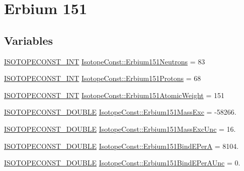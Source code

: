 \hypertarget{group___isotope_const-_erbium-_er151}{}\section{Erbium 151}
\label{group___isotope_const-_erbium-_er151}
\subsection*{Variables}
\begin{DoxyCompactItemize}
\item 
\mbox{\hyperlink{group___isotope_const-_macros_ga5f18360b3e99483a35c32d789e62621c}{I\+S\+O\+T\+O\+P\+E\+C\+O\+N\+S\+T\+\_\+\+I\+NT}} \mbox{\hyperlink{group___isotope_const-_erbium-_er151_ga3f9974804b4c5e005ab739509f5ff448}{Isotope\+Const\+::\+Erbium151\+Neutrons}} = 83
\item 
\mbox{\hyperlink{group___isotope_const-_macros_ga5f18360b3e99483a35c32d789e62621c}{I\+S\+O\+T\+O\+P\+E\+C\+O\+N\+S\+T\+\_\+\+I\+NT}} \mbox{\hyperlink{group___isotope_const-_erbium-_er151_gac02b4fea50718a36bfa658124609d28b}{Isotope\+Const\+::\+Erbium151\+Protons}} = 68
\item 
\mbox{\hyperlink{group___isotope_const-_macros_ga5f18360b3e99483a35c32d789e62621c}{I\+S\+O\+T\+O\+P\+E\+C\+O\+N\+S\+T\+\_\+\+I\+NT}} \mbox{\hyperlink{group___isotope_const-_erbium-_er151_ga653920cb7f79cdd1aef7ffa2ba339f72}{Isotope\+Const\+::\+Erbium151\+Atomic\+Weight}} = 151
\item 
\mbox{\hyperlink{group___isotope_const-_macros_ga8f45a7272ce02c0b4c65c44636ed719a}{I\+S\+O\+T\+O\+P\+E\+C\+O\+N\+S\+T\+\_\+\+D\+O\+U\+B\+LE}} \mbox{\hyperlink{group___isotope_const-_erbium-_er151_gaad65f0a01d1cb60bead2738827e151b6}{Isotope\+Const\+::\+Erbium151\+Mass\+Exc}} = -\/58266.
\item 
\mbox{\hyperlink{group___isotope_const-_macros_ga8f45a7272ce02c0b4c65c44636ed719a}{I\+S\+O\+T\+O\+P\+E\+C\+O\+N\+S\+T\+\_\+\+D\+O\+U\+B\+LE}} \mbox{\hyperlink{group___isotope_const-_erbium-_er151_ga5e1824c3d80a27d0688bdf2b682cf31a}{Isotope\+Const\+::\+Erbium151\+Mass\+Exc\+Unc}} = 16.
\item 
\mbox{\hyperlink{group___isotope_const-_macros_ga8f45a7272ce02c0b4c65c44636ed719a}{I\+S\+O\+T\+O\+P\+E\+C\+O\+N\+S\+T\+\_\+\+D\+O\+U\+B\+LE}} \mbox{\hyperlink{group___isotope_const-_erbium-_er151_ga65886f31b1e0c0997cd6f1b3a27a49b0}{Isotope\+Const\+::\+Erbium151\+Bind\+E\+PerA}} = 8104.
\item 
\mbox{\hyperlink{group___isotope_const-_macros_ga8f45a7272ce02c0b4c65c44636ed719a}{I\+S\+O\+T\+O\+P\+E\+C\+O\+N\+S\+T\+\_\+\+D\+O\+U\+B\+LE}} \mbox{\hyperlink{group___isotope_const-_erbium-_er151_ga94cd4ccbfc78fa616c1c6541d99d317a}{Isotope\+Const\+::\+Erbium151\+Bind\+E\+Per\+A\+Unc}} = 0.

\end{DoxyCompactItemize}
